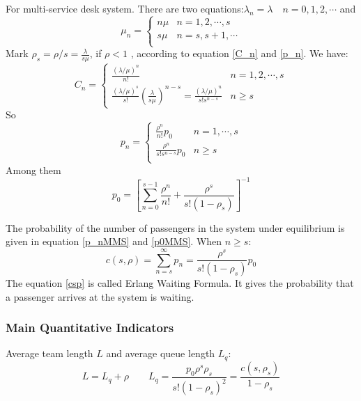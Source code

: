 \documentclass{mcmthesis}
\begin{document}
\par  For multi-service desk system. There are two equations:$\lambda_n = \lambda \quad n = 0,1,2,\cdots$
and 
$$\mu_n=
\begin{cases}
n\mu & \text{$n = 1, 2,\cdots,s$}\\
s\mu & \text{$n = s, s+1,\cdots$}\\
\end{cases}$$
Mark $\rho_s = \rho/s = \frac{\lambda}{s\mu}$, if $\rho < 1$ , according to equation \ref{C_n} and \ref{p_n}. We have:
\begin{equation}
	C_n = 
	\begin{cases}
		\frac{(\lambda / \mu)^n}{n!} & \text{$n = 1, 2,\cdots,s$}\\
		\frac{(\lambda / \mu)^s}{s!}\left(\frac{\lambda}{s\mu}\right)^{n-s} = \frac{(\lambda / \mu)^n}{s!s^{n-s}} & \text{$n \geqslant s$} \label{C_nMMS}
	\end{cases} 
\end{equation}
So 
\begin{equation}
	p_n = 
	\begin{cases}
		\frac{\rho^n}{n!}p_0  & \text{$n = 1, \cdots, s$}\\
		\frac{\rho^n}{s!s^{n-s}}p_0 & \text{$n \geqslant s$}\\
	\end{cases}
	\label{p_nMMS}
\end{equation}
Among them
\begin{equation}
	p_0 = \left[ \sum \limits_{n=0}^{s-1} \frac{\rho^n}{n!} + \frac{\rho^s}{s!(1-\rho_s)} \right]^{-1} \label{p0MMS}
\end{equation}
\par The probability of the number of passengers in the system under equilibrium is given in equation \ref{p_nMMS} and \ref{p0MMS}. When $n \geqslant s$:
\begin{equation}
	c(s,\rho) = \sum \limits_{n = s}^\infty p_n = \frac{\rho^s}{s!(1-\rho_s)}p_0 \label{csp}
\end{equation}
The equation \ref{csp} is called Erlang Waiting Formula. It gives the probability that a passenger arrives at the system is waiting.


\subsubsection*{Main Quantitative Indicators}
\par Average team length $L$ and average queue length $L_q$:
\begin{equation}
		L  = L_q + \rho \qquad 	L_q  = \frac{p_0\rho^s \rho_s}{s!(1-\rho_s)^2} = \frac{c(s,\rho_s)}{1-\rho_s} 
\end{equation}
\end{document}
